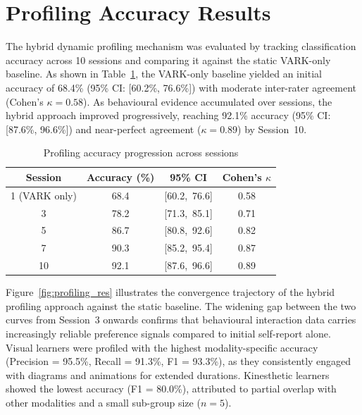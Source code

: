 \section{Profiling Accuracy Results}

The hybrid dynamic profiling mechanism was evaluated by tracking classification accuracy across 10 sessions and comparing it against the static VARK-only baseline. As shown in Table~\ref{tab:profiling}, the VARK-only baseline yielded an initial accuracy of 68.4\% (95\% CI: [60.2\%, 76.6\%]) with moderate inter-rater agreement (Cohen's $\kappa = 0.58$). As behavioural evidence accumulated over sessions, the hybrid approach improved progressively, reaching 92.1\% accuracy (95\% CI: [87.6\%, 96.6\%]) and near-perfect agreement ($\kappa = 0.89$) by Session~10.

\begin{table}[htb]
	\fontsize{10}{12}\selectfont
	\centering
	\caption{Profiling accuracy progression across sessions}
	\label{tab:profiling}
	\begin{tabular}{|c|c|c|c|}
		\hline
		\textbf{Session} & \textbf{Accuracy (\%)} & \textbf{95\% CI} & \textbf{Cohen's $\kappa$} \\
		\hline
		1 (VARK only) & 68.4 & {[}60.2,\ 76.6{]} & 0.58 \\
		\hline
		3             & 78.2 & {[}71.3,\ 85.1{]} & 0.71 \\
		\hline
		5             & 86.7 & {[}80.8,\ 92.6{]} & 0.82 \\
		\hline
		7             & 90.3 & {[}85.2,\ 95.4{]} & 0.87 \\
		\hline
		10            & 92.1 & {[}87.6,\ 96.6{]} & 0.89 \\
		\hline
	\end{tabular}
\end{table}

Figure~\ref{fig:profiling_res} illustrates the convergence trajectory of the hybrid profiling approach against the static baseline. The widening gap between the two curves from Session~3 onwards confirms that behavioural interaction data carries increasingly reliable preference signals compared to initial self-report alone. Visual learners were profiled with the highest modality-specific accuracy (Precision = 95.5\%, Recall = 91.3\%, F1 = 93.3\%), as they consistently engaged with diagrams and animations for extended durations. Kinesthetic learners showed the lowest accuracy (F1 = 80.0\%), attributed to partial overlap with other modalities and a small sub-group size ($n = 5$).

